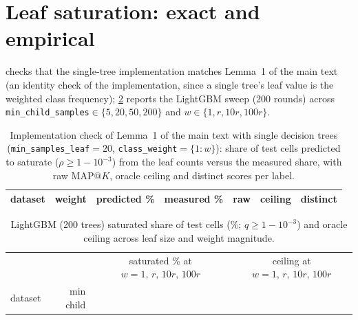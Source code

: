 \documentclass[sigconf,nonacm]{acmart}
\makeatletter
\newcommand{\mapk}{\mathrm{MAP}@K\xspace}
\makeatother
\begin{document}
\section{Leaf saturation: exact and empirical}
\label{app:leaf}
 checks that the single-tree implementation matches Lemma~1 of the main text (an identity check of the implementation, since a single tree's leaf value is the weighted class frequency); \cref{tab:leaf_lgbm} reports the LightGBM sweep (200 rounds) across \texttt{min\_child\_samples}$\in\{5,20,50,200\}$ and $w\in\{1,r,10r,100r\}$.
\begin{table}[H]
\caption{Implementation check of Lemma~1 of the main text with single decision trees (\texttt{min\_samples\_leaf}$=20$, \texttt{class\_weight}$=\{1{:}w\}$): share of test cells predicted to saturate ($\rho\ge1-10^{-3}$) from the leaf counts versus the measured share, with raw $\mapk$, oracle ceiling and distinct scores per label.}
\label{tab:leaf}
\footnotesize
\setlength{\tabcolsep}{4pt}
\begin{tabular}{@{}llrrccr@{}}
\toprule
dataset & weight & predicted \% & measured \% & raw & ceiling & distinct \\
\midrule

\bottomrule
\end{tabular}
\end{table}
\begin{table}[H]
\caption{LightGBM (200 trees) saturated share of test cells (\%; $q\ge1-10^{-3}$) and oracle ceiling across leaf size and weight magnitude.}
\label{tab:leaf_lgbm}
\footnotesize
\setlength{\tabcolsep}{3pt}
\begin{tabular}{@{}lr|rrrr|rrrr@{}}
\toprule
 & & \multicolumn{4}{c|}{saturated \% at $w{=}1,\,r,\,10r,\,100r$} & \multicolumn{4}{c}{ceiling at $w{=}1,\,r,\,10r,\,100r$} \\
dataset & min child & & & & & & & & \\
\midrule

\bottomrule
\end{tabular}
\end{table}
\end{document}
